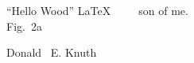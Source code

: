 \documentclass[11pt,oneside,a4paper]{article}
\begin{document}
``Hello Wood'' \LaTeX \ \ \ \ \ son of me. \\


Fig.~2a \par
Donald ~E. Knuth \par
% 
% 
\end{document}

